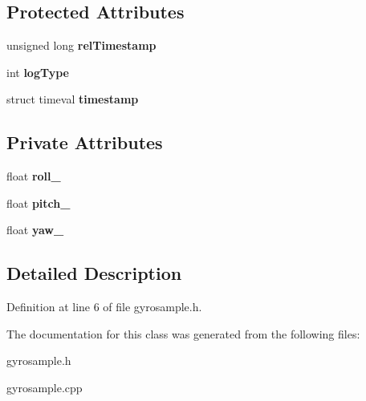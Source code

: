 \subsection*{Protected Attributes}
\begin{DoxyCompactItemize}
\item 
\hypertarget{class_sample_a24ea733ab0a815949a57aca2a4740e33}{unsigned long {\bfseries rel\-Timestamp}}\label{class_sample_a24ea733ab0a815949a57aca2a4740e33}

\item 
\hypertarget{class_sample_a3a6454628c790459f41de5c83bf3ec7c}{int {\bfseries log\-Type}}\label{class_sample_a3a6454628c790459f41de5c83bf3ec7c}

\item 
\hypertarget{class_sample_adbde42442423cd9dc8d971bf764391cc}{struct timeval {\bfseries timestamp}}\label{class_sample_adbde42442423cd9dc8d971bf764391cc}

\end{DoxyCompactItemize}
\subsection*{Private Attributes}
\begin{DoxyCompactItemize}
\item 
\hypertarget{class_gyro_sample_a54e5450ba9577976cdaba4f5c2e61422}{float {\bfseries roll\-\_\-}}\label{class_gyro_sample_a54e5450ba9577976cdaba4f5c2e61422}

\item 
\hypertarget{class_gyro_sample_ad2574d31543929b4d54bf64236346bdb}{float {\bfseries pitch\-\_\-}}\label{class_gyro_sample_ad2574d31543929b4d54bf64236346bdb}

\item 
\hypertarget{class_gyro_sample_ae9454e936037dfb739b355e1baed42b5}{float {\bfseries yaw\-\_\-}}\label{class_gyro_sample_ae9454e936037dfb739b355e1baed42b5}

\end{DoxyCompactItemize}


\subsection{Detailed Description}


Definition at line 6 of file gyrosample.\-h.



The documentation for this class was generated from the following files\-:\begin{DoxyCompactItemize}
\item 
gyrosample.\-h\item 
gyrosample.\-cpp\end{DoxyCompactItemize}
